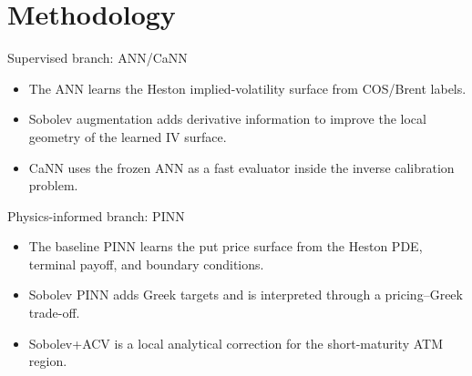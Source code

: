 \section{Methodology}

\begin{frame}{Supervised branch: ANN/CaNN}
  \centering

  \vspace{4mm}
  \begin{itemize}
    \item The ANN learns the Heston implied-volatility surface from COS/Brent labels.
    \item Sobolev augmentation adds derivative information to improve the local geometry of the learned IV surface.
    \item CaNN uses the frozen ANN as a fast evaluator inside the inverse calibration problem.
  \end{itemize}
\end{frame}

\begin{frame}{Physics-informed branch: PINN}
  \centering

  \vspace{4mm}
  \begin{itemize}
    \item The baseline PINN learns the put price surface from the Heston PDE, terminal payoff, and boundary conditions.
    \item Sobolev PINN adds Greek targets and is interpreted through a pricing--Greek trade-off.
    \item Sobolev+ACV is a local analytical correction for the short-maturity ATM region.
  \end{itemize}
\end{frame}
